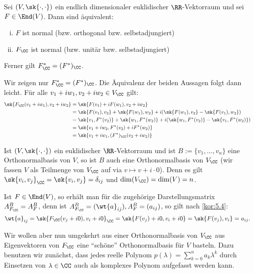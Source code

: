 \begin{lemma}
	\label{lemma:7.7}
	Sei $(V,\sk{\cdot,\cdot})$ ein endlich dimensionaler euklidischer $\RR$-Vektorraum und sei $F \in \End(V)$.
	Dann sind äquivalent:
	\begin{enumerate}[(i)]
		\item $F$ ist normal (bzw. orthogonal bzw. selbstadjungiert)
		\item $F_{\CC}$ ist normal (bzw. unitär bzw. selbstadjungiert)
	\end{enumerate}
	Ferner gilt $F_{\CC}^* = (F^*)_{\CC}$.
\end{lemma}

\begin{beweis}
	Wir zeigen nur $F_{\CC}^* = (F^*)_{\CC}$.
	Die Äquivalenz der beiden Aussagen folgt dann leicht.
	Für alle $v_1+iw_1, v_2+iw_2 \in V_{\CC}$ gilt:
	\newpage
	\vspace*{-1.3cm}
	\begin{align*}
	\sk{F_{\CC}(v_1+iw_1),v_2+iw_2} &= \sk{F(v_1) + i F(w_1),v_2+iw_2} \\
	&= \sk{F(v_1),v_2} + \sk{F(w_1),w_2} + i( \sk{F(w_1),v_2} - \sk{F(v_1),w_2}) \\
	&= \sk{v_1,F^*(v_2)} + \sk{w_1,F^*(w_2)} + i(\sk{w_1,F^*(v_2)} - \sk{v_1,F^*(w_2)}) \\
	&= \sk{v_1 + iw_2,F^*(v_2) + iF^*(w_2)} \\
	&= \sk{v_1 + iw_1, (F^*)_{\CC}(v_2+iw_2)} 
	\end{align*}
\end{beweis}

\begin{bemerkung}
	\label{bem:7.8}
	Ist $(V,\sk{\cdot,\cdot})$ ein euklidischer $\RR$-Vektorraum und ist $B := \{v_1,\dots,v_n\}$ eine Orthonormalbasis von $V$, so ist $B$ auch eine Orthonormalbasis von $V_{\CC}$ (wir fassen $V$ als Teilmenge von $V_{\CC}$ auf via $v \mapsto v + i \cdot 0$).
	Denn es gilt $\sk{v_i,v_j}_{\CC} = \sk{v_i,v_j} = \delta_{ij}$ und $\dim(V_{\CC}) = \dim(V) = n$.
	
	Ist $F \in \End(V)$, so erhält man für die zugehörige Darstellungsmatrix $A^B_{F_{\CC}} = A^B_F$, denn ist $A^B_{F_{\CC}} = (\wt{a}_{ij}), A^B_F = (a_{ij})$, so gilt nach \autoref{kor:5.4}:
	\[
		\wt{a}_{ij} = \sk{F_{\CC}(v_j + i0),v_i + i0}_{\CC} = \sk{F(v_j)+i0,v_i+i0} = \sk{F(v_j),v_i} = a_{ij}.
	\]
\end{bemerkung}

Wir wollen aber nun umgekehrt aus einer Orthonormalbasis von $V_{\CC}$ aus Eigenvektoren von $F_{\CC}$ eine \enquote{schöne} Orthonormalbasis für $V$ basteln.
Dazu benutzen wir zunächst, dass jedes reelle Polynom $p(\lambda) = \sum_{k=0}^{n} a_k \lambda^k$ durch Einsetzen von $\lambda \in \CC$ auch als komplexes Polynom aufgefasst werden kann.

